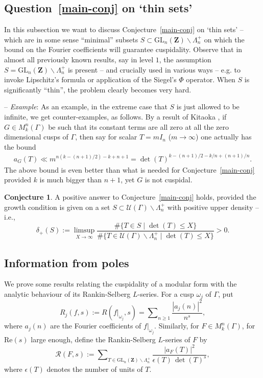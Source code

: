 \documentclass[12pt]{amsart}
\numberwithin{equation}{section}
\theoremstyle{plain}
\theoremstyle{definition}
\newtheorem{conj}[thm]{Conjecture}
\newcommand{\conjref}[1]{Conjecture~\ref{#1}}
\newcommand{\re}{\mrm{Re}}
\newcommand{\mf}{\mathbf}
\newcommand{\mc}{\mathcal}
\newcommand{\mrm}{\mathrm}
\newcommand{\mcr}{\mathscr}
\newcommand{\glnz}{\mrm{GL}_n( \mf Z)}
\newcommand{\mkngam}{M^n_k(\Gamma)}
\newcommand{\sumn}{\sum \nolimits}
\begin{document}
\subsection{Question~\ref{main-conj} on `thin sets'} \label{thin}
In this subsection we want to discuss \conjref{main-conj} on `thin sets' -- which are in some sense ``minimal'' subsets $S \subset \glnz \backslash \Lambda^+_n $ on which the bound on the Fourier coefficients will guarantee cuspidality. Observe that in almost all previously known results, say in level $1$, the assumption $S= \glnz \backslash \Lambda^+_n  $ is present -- and crucially used in various ways -- e.g. to invoke Lipschitz's formula or application of the Siegel's $\Phi$ operator. When $S$ is significantly ``thin'', the problem clearly becomes very hard. 

-- \textit{Example}: As an example, in the extreme case that $S$ is just allowed to be infinite, we get counter-examples, as follows. By a result of Kitaoka \cite[Theorem 1.4.5, p. 73]{kitaoka-tata}, if $G \in M^n_k(\Gamma)$ be such that its constant terms are all zero at all the zero dimensional cusps of $\Gamma$, then say for scalar $T=mI_n$ ($m \to \infty$) one actually has the bound
\begin{align}
    a_G(T) \ll m^{n(k-(n+1)/2) - k +n+1} = \det(T)^{k - (n+1)/2 - k/n + (n+1)/n}. 
\end{align}
The above bound is even better than what is needed for \conjref{main-conj} provided $k$ is much bigger than $n+1$, yet $G$ is not cuspidal.

\begin{conj} \label{thin-conj}
    A positive answer to \conjref{main-conj} holds, provided the growth condition is given on a set $S \subset \mcr U(\Gamma) \backslash \Lambda^+_n $ with positive upper density -- i.e., 
    \[  \delta_+(S):=\limsup_{X \to \infty} \frac{ \# \{  T \in S \mid \det(T) \le X \} }{ \# \{T \in \mcr U(\Gamma) \backslash \Lambda_n^+ \mid \det(T) \le X \} } >0. \]
\end{conj}

\subsection{Information from poles} \label{poles}
We prove some results relating the cuspidality of a modular form with the analytic behaviour of its Rankin-Selberg $L$-series.  For a cusp $\omega_j$ of $\Gamma$, put 
\[ R_j(f,s):= R(f|_{\omega_j},s) = \sumn_{n \ge 1} \frac{|a_j(n)|^2}{n^s} ,\]
where $a_j(n)$ are the Fourier coefficients of $f|_{\omega_j}$. Similarly, for $F \in \mkngam$, for $\re(s)$ large enough, define the Rankin-Selberg $L$-series of $F$ by
\begin{equation} \label{rffs}
    \mc R(F,s):= \sumn_{T \in \glnz \backslash \Lambda_n^+}\frac{|a_F(T)|^2}{\epsilon(T) \, \det(T)^s},
\end{equation}
where $\epsilon(T)$ denotes the number of units of $T$. 
\end{document}
